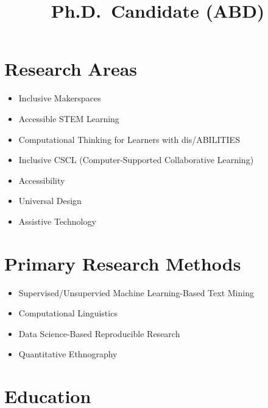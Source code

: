 \documentclass[11pt,a4paper,]{moderncv}
\title{Ph.D.~Candidate (ABD)}
\providecommand{\tightlist}{%
	\setlength{\itemsep}{0pt}\setlength{\parskip}{0pt}}
\begin{document}
\makecvtitle



\hypertarget{research-areas}{%
\section{Research Areas}\label{research-areas}}

\begin{itemize}
\tightlist
\item
  Inclusive Makerspaces
\item
  Accessible STEM Learning
\item
  Computational Thinking for Learners with dis/ABILITIES
\item
  Inclusive CSCL (Computer-Supported Collaborative Learning)
\item
  Accessibility
\item
  Universal Design
\item
  Assistive Technology
\end{itemize}

\hypertarget{primary-research-methods}{%
\section{Primary Research Methods}\label{primary-research-methods}}

\begin{itemize}
\tightlist
\item
  Supervised/Unsupervied Machine Learning-Based Text Mining
\item
  Computational Linguistics
\item
  Data Science-Based Reproducible Research
\item
  Quantitative Ethnography
\end{itemize}

\hypertarget{education}{%
\section{Education}\label{education}}
\end{document}
